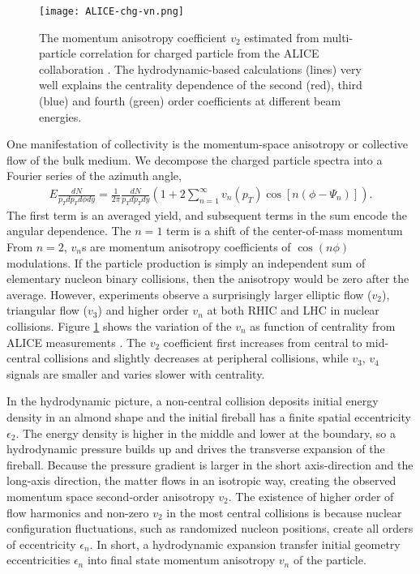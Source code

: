 \begin{figure}
\centering
\texttt{[image: ALICE-chg-vn.png]}
\caption{The momentum anisotropy coefficient $v_2$ estimated from multi-particle correlation for charged particle from the ALICE collaboration \cite{ALICE:2011ab,Adam:2016izf}.
The hydrodynamic-based calculations \cite{Niemi:2015voa,Noronha-Hostler:2015uye} (lines) very well explains the centrality dependence of the second (red), third (blue) and fourth (green) order coefficients at different beam energies.}
\label{fig:intro:vn}
\end{figure}

One manifestation of collectivity is the momentum-space anisotropy or collective flow of the bulk medium.
We decompose the charged particle spectra into a Fourier series of the azimuth angle,
\begin{eqnarray}
E\frac{dN}{p_T dp_T d\phi dy} = \frac{1}{2\pi}\frac{dN}{p_T dp_T dy}\left(1 + 2\sum_{n=1}^{\infty}v_n(p_T)\cos\left[n(\phi-\Psi_n)\right]\right).
\end{eqnarray}
The first term is an averaged yield, and subsequent terms in the sum encode the angular dependence. 
The $n=1$ term is a shift of the center-of-mass momentum
From $n=2$, $v_n$s are momentum anisotropy coefficients of $\cos({n\phi})$ modulations.
If the particle production is simply an independent sum of elementary nucleon binary collisions, then the anisotropy would be zero after the average. 
However, experiments observe a surprisingly larger elliptic flow ($v_2$), triangular flow ($v_3$) and higher order $v_n$ at both RHIC and LHC in nuclear collisions.
Figure \ref{fig:intro:vn} shows the variation of the $v_n$ as function of centrality from ALICE measurements \cite{ALICE:2011ab,Adam:2016izf}.
The $v_2$ coefficient first increases from central to mid-central collisions and slightly decreases at peripheral collisions, while $v_3$, $v_4$ signals are smaller and varies slower with centrality.

In the hydrodynamic picture, a non-central collision deposits initial energy density in an almond shape and the initial fireball has a finite spatial eccentricity $\epsilon_2$.
The energy density is higher in the middle and lower at the boundary, so a hydrodynamic pressure builds up and drives the transverse expansion of the fireball.
Because the pressure gradient is larger in the short axis-direction and the long-axis direction, the matter flows in an isotropic way, creating the observed momentum space second-order anisotropy $v_2$.
The existence of higher order of flow harmonics and non-zero $v_2$ in the most central collisions is because nuclear configuration fluctuations, such as randomized nucleon positions, create all orders of eccentricity $\epsilon_n$.
In short, a hydrodynamic expansion transfer initial geometry eccentricities $\epsilon_n$ into final state momentum anisotropy $v_n$ of the particle.

